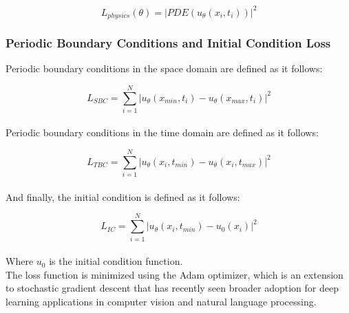 \documentclass{article}
\begin{document}
$$
L_{physics}(\theta)=|PDE(u_\theta(x_i,t_i))|^2
$$

\subsubsection*{Periodic Boundary Conditions and Initial Condition Loss}

Periodic boundary conditions in the space domain are defined as it follows:

$$
L_{SBC} = \sum_{i=1}^{N} |u_\theta(x_{min},t_i) - u_\theta(x_{max},t_i)|^2
$$
\\
Periodic boundary conditions in the time domain are defined as it follows:

$$
L_{TBC} = \sum_{i=1}^{N} |u_\theta(x_i,t_{min}) - u_\theta(x_i,t_{max})|^2
$$
\\
And finally, the initial condition is defined as it follows:

$$
L_{IC} = \sum_{i=1}^{N} |u_\theta(x_i,t_{min}) - u_{0}(x_i)|^2
$$
\\
Where $u_0$ is the initial condition function.\\

The loss function is minimized using the Adam optimizer, which is an extension to stochastic gradient descent that has recently seen broader adoption for deep learning applications in computer vision and natural language processing.\\





\end{document}

